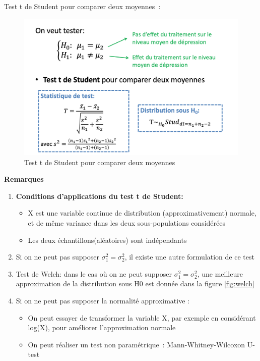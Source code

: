 Test t de Student pour comparer deux moyennes :
\begin{figure}[H]
    \centering
    \includegraphics[scale=0.3]{images/student.png}
    \caption{Test t de Student pour comparer deux moyennes}
    \label{fig:my_label}
\end{figure}


\textbf{Remarques}
\begin{enumerate}
    \item \textbf{Conditions d’applications du test t de Student:}
    \begin{itemize}
        \item X est une variable continue de distribution (approximativement) normale, et de même variance dans les deux sous-populations considérées
        \item Les deux échantillons(aléatoires) sont indépendants
    \end{itemize}
    \item Si on ne peut pas supposer $\sigma_{1}^{2}=\sigma_{2}^{2}$, il existe une autre formulation de ce test
    
    \item Test de Welch: dans le cas où on ne peut supposer $\sigma_{1}^{2}=\sigma_{2}^{2}$, une meilleure approximation de la distribution sous H0 est donnée dans la figure \ref{fig:welch}
    \item Si on ne peut pas supposer la normalité approximative :
    \begin{itemize}
        \item On peut essayer de transformer la variable X, par exemple en considérant log(X), pour améliorer l’approximation normale
        \item On peut réaliser un test non paramétrique : Mann-Whitney-Wilcoxon U-test


    \end{itemize}
\end{enumerate}

